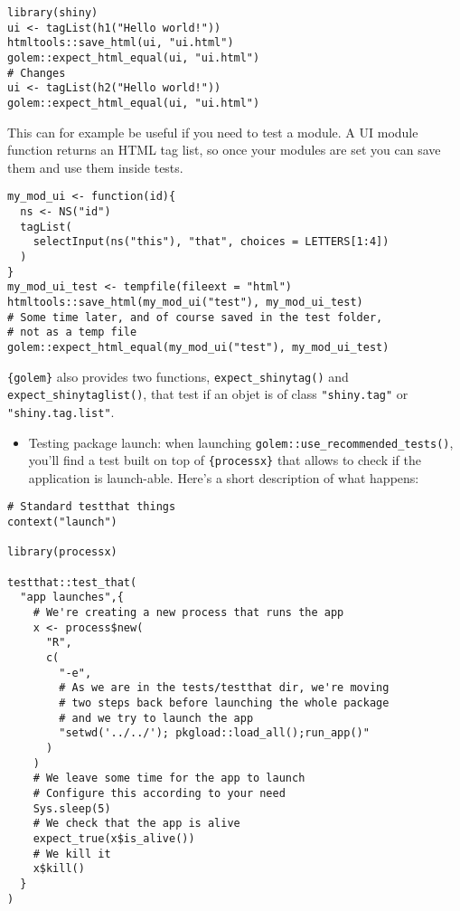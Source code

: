 \documentclass[]{book}
\providecommand{\tightlist}{%
  \setlength{\itemsep}{0pt}\setlength{\parskip}{0pt}}
\begin{document}
\begin{verbatim}
library(shiny)
ui <- tagList(h1("Hello world!"))
htmltools::save_html(ui, "ui.html")
golem::expect_html_equal(ui, "ui.html")
# Changes 
ui <- tagList(h2("Hello world!"))
golem::expect_html_equal(ui, "ui.html")
\end{verbatim}

This can for example be useful if you need to test a module. A UI module function returns an HTML tag list, so once your modules are set you can save them and use them inside tests.

\begin{verbatim}
my_mod_ui <- function(id){
  ns <- NS("id")
  tagList(
    selectInput(ns("this"), "that", choices = LETTERS[1:4])
  )
}
my_mod_ui_test <- tempfile(fileext = "html")
htmltools::save_html(my_mod_ui("test"), my_mod_ui_test)
# Some time later, and of course saved in the test folder, 
# not as a temp file
golem::expect_html_equal(my_mod_ui("test"), my_mod_ui_test)
\end{verbatim}

\texttt{\{golem\}} also provides two functions, \texttt{expect\_shinytag()} and \texttt{expect\_shinytaglist()}, that test if an objet is of class \texttt{"shiny.tag"} or \texttt{"shiny.tag.list"}.

\begin{itemize}
\tightlist
\item
  Testing package launch: when launching \texttt{golem::use\_recommended\_tests()}, you'll find a test built on top of \texttt{\{processx\}} that allows to check if the application is launch-able. Here's a short description of what happens:
\end{itemize}

\begin{verbatim}
# Standard testthat things
context("launch")

library(processx)

testthat::test_that(
  "app launches",{
    # We're creating a new process that runs the app
    x <- process$new(
      "R", 
      c(
        "-e", 
        # As we are in the tests/testthat dir, we're moving 
        # two steps back before launching the whole package
        # and we try to launch the app
        "setwd('../../'); pkgload::load_all();run_app()"
      )
    )
    # We leave some time for the app to launch
    # Configure this according to your need
    Sys.sleep(5)
    # We check that the app is alive
    expect_true(x$is_alive())
    # We kill it
    x$kill()
  }
)
\end{verbatim}
\end{document}
